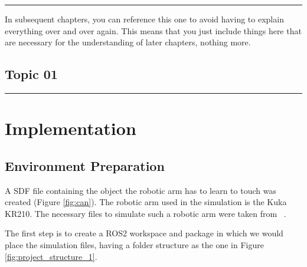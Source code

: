 \documentclass[12pt,oneside]{article}
\begin{document}
\hrule 

In subsequent chapters, you can reference this one to avoid having to explain everything over and over again. This means that you just include things here that are necessary for the understanding of later chapters, nothing more.
\subsection{Topic 01}\label{sec:grundlagen1}
\hrule
%
\section{Implementation}\label{sec:umsetzung}
\subsection{Environment Preparation}
A SDF file containing the object the robotic arm has to learn to touch was created (Figure \ref{fig:can}).
The robotic arm used in the simulation is the Kuka KR210. The necessary files to simulate such a robotic arm were taken from ~\cite{RoboND-Kinematics-Project}. 

The first step is to create a ROS2 workspace and package in which we would place the simulation files, having a folder structure as the one in Figure \ref{fig:project_structure_1}.
\end{document}
